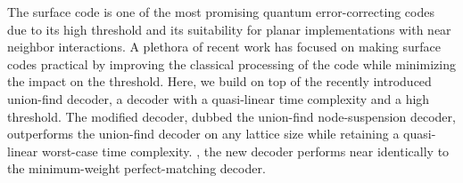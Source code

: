 The surface code is one of the most promising quantum error-correcting codes due to its high threshold and its suitability for planar implementations with near neighbor interactions. A plethora of recent work has focused on making surface codes practical by improving the classical processing of the code while minimizing the impact on the threshold. Here, we build on top of the recently introduced union-find decoder, a decoder with a quasi-linear time complexity and a high threshold. The modified decoder, dubbed the union-find node-suspension decoder, outperforms the union-find decoder on any lattice size while retaining a quasi-linear worst-case time complexity. , the new decoder performs near identically to the minimum-weight perfect-matching decoder.

